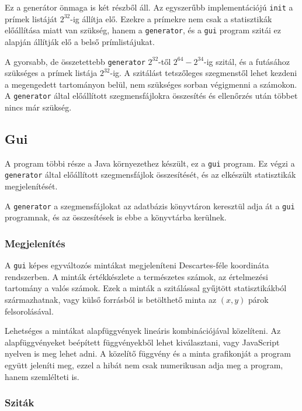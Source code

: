 Ez a generátor önmaga is két részből áll.
Az egyszerűbb implementációjú \texttt{init} a prímek listáját $2^{32}$-ig állítja elő.
Ezekre a prímekre nem csak a statisztikák előállítása miatt van szükség, hanem a \texttt{generator}, és a \texttt{gui} program szitái ez alapján állítják elő a belső prímlistájukat.

A gyorsabb, de összetettebb \texttt{generator} $2^{32}$-től $2^{64}-2^{34}$-ig szitál,
és a futásához szükséges a prímek listája $2^{32}$-ig.
A szitálást tetszőleges szegmenstől lehet kezdeni a megengedett tartományon belül, nem szükséges sorban végigmenni a számokon.
A \texttt{generator} által előállított szegmensfájlokra összesítés és ellenőrzés után többet nincs már szükség.

\subsection{Gui}

A program többi része a Java környezethez készült, ez a \texttt{gui} program.
Ez végzi a \texttt{generator} által előállított szegmensfájlok összesítését, és az elkészült statisztikák megjelenítését.

A \texttt{generator} a szegmensfájlokat az adatbázis könyvtáron keresztül adja át a \texttt{gui} programnak, és az összesítések is ebbe a könyvtárba kerülnek.

\subsubsection{Megjelenítés}

A \texttt{gui} képes egyváltozós mintákat megjeleníteni Descartes-féle koordináta rendszerben.
A minták értékkészlete a természetes számok, az értelmezési tartomány a valós számok.
Ezek a minták a szitálással gyűjtött statisztikákból származhatnak, vagy külső forrásból is betölthető minta az $(x, y)$ párok felsorolásával.

Lehetséges a mintákat alapfüggvények lineáris kombinációjával közelíteni.
Az alapfüggvényeket beépített függvényekből lehet kiválasztani, vagy JavaScript nyelven is meg lehet adni.
A közelítő függvény és a minta grafikonját a program együtt jeleníti meg, ezzel a hibát nem csak numerikusan adja meg a program, hanem szemlélteti is.

\subsubsection{Sziták}

